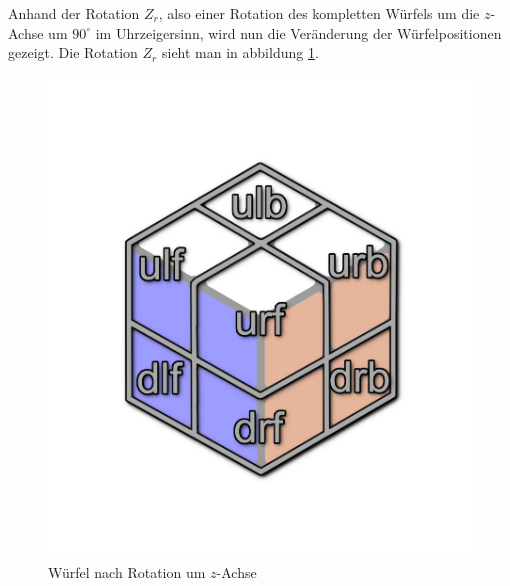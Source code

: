 \documentclass[12pt,a4paper, usenames, dvipsnames]{article}
\begin{document}
Anhand der Rotation $Z_r$, also einer Rotation des kompletten Würfels um die $z$-Achse um $90^\circ$ im Uhrzeigersinn, wird nun die Veränderung der Würfelpositionen gezeigt. Die Rotation $Z_r$ sieht man in abbildung \ref{16}.
\begin{figure}[h]
\centering
\includegraphics[scale=0.13]{auf_ulf.png}
\caption{Würfel nach Rotation um $z$-Achse}
\label{16}
\end{figure}
\end{document}
